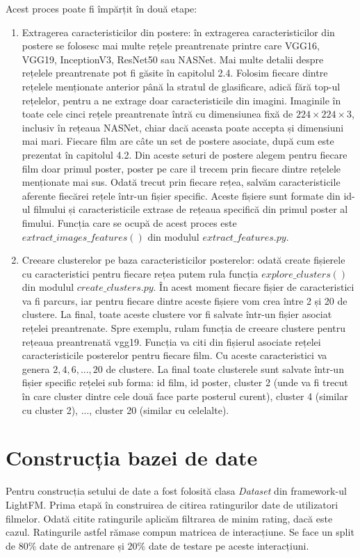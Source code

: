 Acest proces poate fi împărțit în două etape:
\begin{enumerate}
	\item Extragerea caracteristicilor din postere: în extragerea caracteristicilor din postere se folosesc mai multe rețele preantrenate printre care VGG16, VGG19, InceptionV3, ResNet50 sau NASNet. Mai multe detalii despre rețelele preantrenate pot fi găsite în capitolul 2.4. Folosim fiecare dintre rețelele menționate anterior până la stratul de glasificare, adică fără top-ul rețelelor, pentru a ne extrage doar caracteristicile din imagini. Imaginile în toate cele cinci rețele preantrenate întră cu dimensiunea fixă de $224 \times 224 \times 3$, inclusiv în rețeaua NASNet, chiar dacă aceasta poate accepta și dimensiuni mai mari. Fiecare film are câte un set de postere asociate, după cum este prezentat în capitolul 4.2. Din aceste seturi de postere alegem pentru fiecare film doar primul poster, poster pe care il trecem prin fiecare dintre rețelele menționate mai sus. Odată trecut prin fiecare rețea, salvăm caracteristicile aferente fiecărei rețele într-un fișier specific. Aceste fișiere sunt formate din id-ul filmului și caracteristicile extrase de rețeaua specifică din primul poster al fimului.
Funcția care se ocupă de acest proces este $extract\_images\_features()$ din modulul $extract\_features.py$.
	\item Creeare clusterelor pe baza caracteristicilor posterelor: odată create fișierele cu caracteristici pentru fiecare rețea putem rula funcția $explore\_clusters()$ din modulul $create\_clusters.py$. În acest moment fiecare fișier de caracteristici va fi parcurs, iar pentru fiecare dintre aceste fișiere vom crea între 2 și 20 de clustere. La final, toate aceste clustere vor fi salvate într-un fișier asociat rețelei preantrenate. Spre exemplu, rulam funcția de creeare clustere pentru rețeaua preantrenată vgg19. Funcția va citi din fișierul asociate rețelei caracteristicile posterelor pentru fiecare film. Cu aceste caracteristici va genera $2, 4, 6, ..., 20$ de clustere. La final toate clusterele sunt salvate într-un fișier specific rețelei sub forma: id film, id poster, cluster 2 (unde va fi trecut în care cluster dintre cele două face parte posterul curent), cluster 4 (similar cu cluster 2), ..., cluster 20 (similar cu celelalte).
\end{enumerate}

\section{Construcția bazei de date}
Pentru construcția setului de date a fost folosită clasa \textit{Dataset} din framework-ul LightFM. Prima etapă în construirea de citirea ratingurilor date de utilizatori filmelor. Odată citite ratingurile aplicăm filtrarea de minim rating, dacă este cazul. Ratingurile astfel rămase compun matricea de interacțiune. Se face un split de $80\%$ date de antrenare și $20\%$ date de testare pe aceste interacțiuni.

